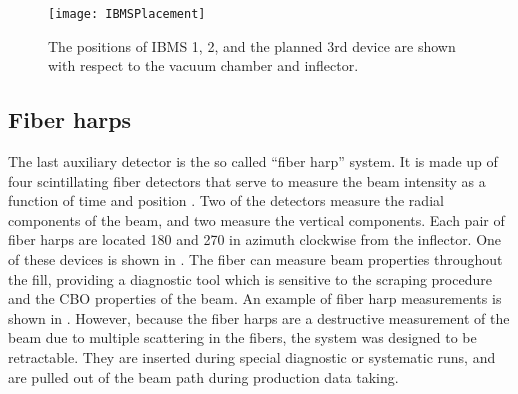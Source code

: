 \begin{figure}
    \centering
    \texttt{[image: IBMSPlacement]}
    \caption[IBMS Positions]{The positions of IBMS 1, 2, and the planned 3rd device are shown with respect to the vacuum chamber and inflector.}   
    \label{fig:IBMSPlacement}
\end{figure}



\subsection{Fiber harps}
\label{sec:FiberHarps}

The last auxiliary detector is the so called ``fiber harp'' system. It is made up of four scintillating fiber detectors that serve to measure the beam intensity as a function of time and position \cite{fiberharp}. Two of the detectors measure the radial components of the beam, and two measure the vertical components. Each pair of fiber harps are located 180\textdegree{} and 270\textdegree{} in azimuth clockwise from the inflector. One of these devices is shown in . The fiber can measure beam properties throughout the fill, providing a diagnostic tool which is sensitive to the scraping procedure and the CBO properties of the beam. An example of fiber harp measurements is shown in . However, because the fiber harps are a destructive measurement of the beam due to multiple scattering in the fibers, the system was designed to be retractable. They are inserted during special diagnostic or systematic runs, and are pulled out of the beam path during production data taking.





